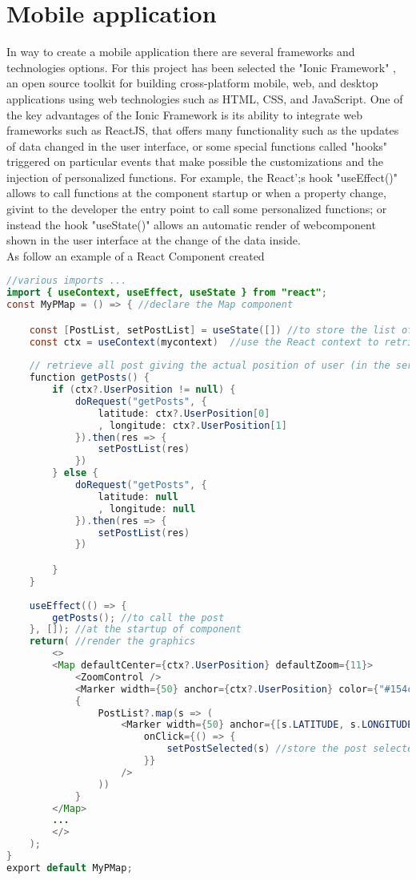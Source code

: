 \documentclass[conference]{IEEEtran}
\begin{document}
\section{Mobile application}
In way to create a mobile application there are several frameworks and technologies options. For this project has been selected the "Ionic Framework" \cite{b1}, an open source toolkit for building cross-platform mobile, web, and desktop applications using web technologies such as HTML, CSS, and JavaScript.
One of the key advantages of the Ionic Framework is its ability to integrate  web frameworks such as ReactJS, that offers many functionality such as the updates of data changed in the user interface, or some special functions called "hooks" triggered on particular events that make possible the customizations and the injection of personalized functions.
For example, the React';s hook "useEffect()" allows to call functions at the component startup or when a property change, givint to the developer the entry point to call some personalized functions; or instead the hook "useState()" allows an automatic render of webcomponent shown in the user interface at the change of the data inside.
\\
As follow an example of a React Component created
\begin{lstlisting}[language=Java, caption=Map component snippet]
//various imports ...
import { useContext, useEffect, useState } from "react";
const MyPMap = () => { //declare the Map component

    const [PostList, setPostList] = useState([]) //to store the list of posts
    const ctx = useContext(mycontext)  //use the React context to retrieve data of other components
    
    // retrieve all post giving the actual position of user (in the server it will be computed the nearest posts)
    function getPosts() {
        if (ctx?.UserPosition != null) {
            doRequest("getPosts", {
                latitude: ctx?.UserPosition[0]
                , longitude: ctx?.UserPosition[1]
            }).then(res => {
                setPostList(res)
            })
        } else {
            doRequest("getPosts", {
                latitude: null
                , longitude: null
            }).then(res => {
                setPostList(res)
            })

        }
    }
    
    useEffect(() => {
        getPosts(); //to call the post
    }, []); //at the startup of component
    return( //render the graphics
        <>
        <Map defaultCenter={ctx?.UserPosition} defaultZoom={11}>
            <ZoomControl />
            <Marker width={50} anchor={ctx?.UserPosition} color={"#154c79"} />
            {
                PostList?.map(s => (
                    <Marker width={50} anchor={[s.LATITUDE, s.LONGITUDE]} color={(s?.MEDIATYPE?.length > 0) ? '#d6c531' : '#f23c3c'}
                        onClick={() => {
                            setPostSelected(s) //store the post selected to open it in the opportuned component (viewPost)
                        }}
                    />
                ))
            }
        </Map>
        ...
        </>
    );
}
export default MyPMap;
\end{lstlisting}
\end{document}

